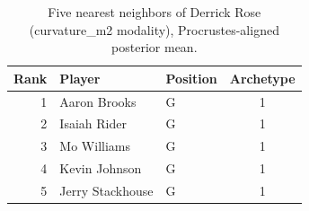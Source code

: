 \begin{table}[htbp]
  \centering\small
  \begin{tabular}{rllc}
    \toprule
    Rank & Player & Position & Archetype \\
    \midrule
    1 & Aaron Brooks & G & 1 \\
    2 & Isaiah Rider & G & 1 \\
    3 & Mo Williams & G & 1 \\
    4 & Kevin Johnson & G & 1 \\
    5 & Jerry Stackhouse & G & 1 \\
    \bottomrule
  \end{tabular}
  \caption{Five nearest neighbors of Derrick Rose (curvature_m2 modality), Procrustes-aligned posterior mean.}
  \label{tab:Derrick_Rose_neighbors_curvature_m2}
\end{table}

